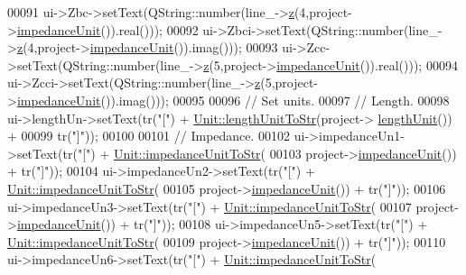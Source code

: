 \begin{DoxyCode}
00091   ui->Zbc->setText(QString::number(line\_->\hyperlink{group___models_ga0b44ccb2f14635c42d7eab3fe8940692}{z}(4,project->\hyperlink{class_project_ad0725b9aa4445dd6d21d4e15df482d3b}{impedanceUnit}()).real()));
00092   ui->Zbci->setText(QString::number(line\_->\hyperlink{group___models_ga0b44ccb2f14635c42d7eab3fe8940692}{z}(4,project->\hyperlink{class_project_ad0725b9aa4445dd6d21d4e15df482d3b}{impedanceUnit}()).imag()));
00093   ui->Zcc->setText(QString::number(line\_->\hyperlink{group___models_ga0b44ccb2f14635c42d7eab3fe8940692}{z}(5,project->\hyperlink{class_project_ad0725b9aa4445dd6d21d4e15df482d3b}{impedanceUnit}()).real()));
00094   ui->Zcci->setText(QString::number(line\_->\hyperlink{group___models_ga0b44ccb2f14635c42d7eab3fe8940692}{z}(5,project->\hyperlink{class_project_ad0725b9aa4445dd6d21d4e15df482d3b}{impedanceUnit}()).imag()));
00095 
00096   \textcolor{comment}{// Set units.}
00097   \textcolor{comment}{// Length.}
00098   ui->lengthUn->setText(tr(\textcolor{stringliteral}{"["}) + \hyperlink{class_unit_abd363319f79f97b0a0b9a08c5ddc3cdb}{Unit::lengthUnitToStr}(project->
      \hyperlink{class_project_a40cd2f59a4a708897e5997942c046f4d}{lengthUnit}()) +
00099                         tr(\textcolor{stringliteral}{"]"}));
00100 
00101   \textcolor{comment}{// Impedance.}
00102   ui->impedanceUn1->setText(tr(\textcolor{stringliteral}{"["}) + \hyperlink{class_unit_ae3ca20f4b6530f04ca6aa138ec0fa7d2}{Unit::impedanceUnitToStr}(
00103                               project->\hyperlink{class_project_ad0725b9aa4445dd6d21d4e15df482d3b}{impedanceUnit}()) + tr(\textcolor{stringliteral}{"]"}));
00104   ui->impedanceUn2->setText(tr(\textcolor{stringliteral}{"["}) + \hyperlink{class_unit_ae3ca20f4b6530f04ca6aa138ec0fa7d2}{Unit::impedanceUnitToStr}(
00105                               project->\hyperlink{class_project_ad0725b9aa4445dd6d21d4e15df482d3b}{impedanceUnit}()) + tr(\textcolor{stringliteral}{"]"}));
00106   ui->impedanceUn3->setText(tr(\textcolor{stringliteral}{"["}) + \hyperlink{class_unit_ae3ca20f4b6530f04ca6aa138ec0fa7d2}{Unit::impedanceUnitToStr}(
00107                               project->\hyperlink{class_project_ad0725b9aa4445dd6d21d4e15df482d3b}{impedanceUnit}()) + tr(\textcolor{stringliteral}{"]"}));
00108   ui->impedanceUn5->setText(tr(\textcolor{stringliteral}{"["}) + \hyperlink{class_unit_ae3ca20f4b6530f04ca6aa138ec0fa7d2}{Unit::impedanceUnitToStr}(
00109                               project->\hyperlink{class_project_ad0725b9aa4445dd6d21d4e15df482d3b}{impedanceUnit}()) + tr(\textcolor{stringliteral}{"]"}));
00110   ui->impedanceUn6->setText(tr(\textcolor{stringliteral}{"["}) + \hyperlink{class_unit_ae3ca20f4b6530f04ca6aa138ec0fa7d2}{Unit::impedanceUnitToStr}(

\end{DoxyCode}

